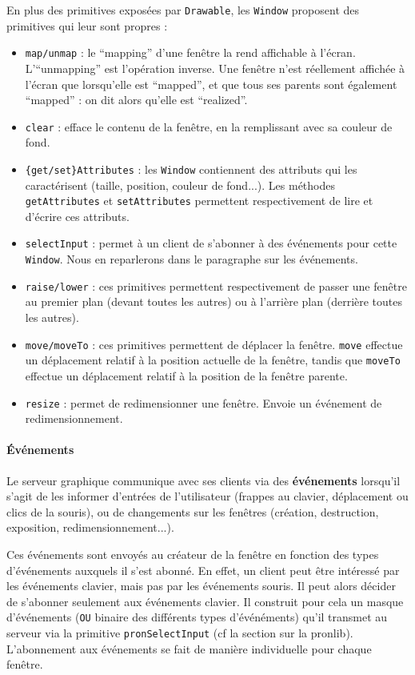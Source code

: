 En plus des primitives exposées par \verb|Drawable|, les \verb|Window| proposent des primitives qui leur sont propres :
\begin{itemize}
  \item \verb|map/unmap| : le ``mapping'' d'une fenêtre la rend affichable à l'écran. L'``unmapping'' est l'opération inverse. Une fenêtre n'est réellement affichée à l'écran que lorsqu'elle est ``mapped'', et que tous ses parents sont également ``mapped'' : on dit alors qu'elle est ``realized''.
  \item \verb|clear| : efface le contenu de la fenêtre, en la remplissant avec sa couleur de fond.
  \item \verb|{get/set}Attributes| : les \verb|Window| contiennent des attributs qui les caractérisent (taille, position, couleur de fond...). Les méthodes \verb|getAttributes| et \verb|setAttributes| permettent respectivement de lire et d'écrire ces attributs.
  \item \verb|selectInput| : permet à un client de s'abonner à des événements pour cette \verb|Window|. Nous en reparlerons dans le paragraphe sur les événements.
  \item \verb|raise/lower| : ces primitives permettent respectivement de passer une fenêtre au premier plan (devant toutes les autres) ou à l'arrière plan (derrière toutes les autres).
  \item \verb|move/moveTo| : ces primitives permettent de déplacer la fenêtre. \verb|move| effectue un déplacement relatif à la position actuelle de la fenêtre, tandis que \verb|moveTo| effectue un déplacement relatif à la position de la fenêtre parente.
  \item \verb|resize| : permet de redimensionner une fenêtre. Envoie un événement de redimensionnement.
\end{itemize}

\paragraph{Événements}
Le serveur graphique communique avec ses clients via des \textbf{événements} lorsqu'il s'agit de les informer d'entrées de l'utilisateur (frappes au clavier, déplacement ou clics de la souris), ou de changements sur les fenêtres (création, destruction, exposition, redimensionnement...).

Ces événements sont envoyés au créateur de la fenêtre en fonction des types d'événements auxquels il s'est abonné. En effet, un client peut être intéressé par les événements clavier, mais pas par les événements souris. Il peut alors décider de s'abonner seulement aux événements clavier. Il construit pour cela un masque d'événements (\verb|OU| binaire des différents types d'événéments) qu'il transmet au serveur via la primitive \verb|pronSelectInput| (cf la section sur la pronlib). L'abonnement aux événements se fait de manière individuelle pour chaque fenêtre.

